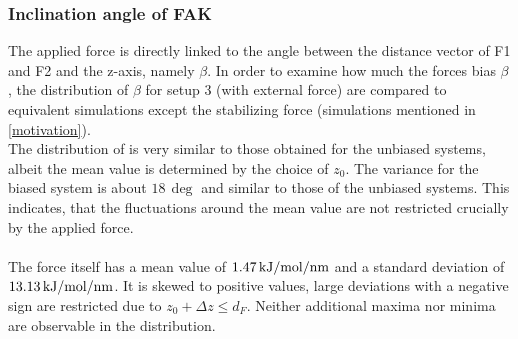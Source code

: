 \subsubsection{Inclination angle of FAK}
The applied force is directly linked to the angle between the distance vector of F1 and F2 and the z-axis, namely $\beta$. In order to examine how much the forces bias $\beta$, the distribution of $\beta$ for setup 3 (with external force) are compared to equivalent simulations except the stabilizing force (simulations mentioned in \autoref{motivation}).\\
The distribution of is very similar to those obtained for the unbiased systems, albeit the mean value is determined by the choice of $z_0$. The variance for the biased system is about $18\,\si{\deg}$ and similar to those of the unbiased systems. This indicates, that the fluctuations around the mean value are not restricted crucially by the applied force.\\
\\
The force itself has a mean value of $1.47\,\si{\kilo\joule/\mole/\nano\metre}$ and a standard deviation of $13.13\,\si{\kilo\joule/\mole/\nano\metre}$. It is skewed to positive values, large deviations with a negative sign are restricted due to $z_0 + \Delta z \le d_F$. Neither additional maxima nor minima are observable in the distribution.

